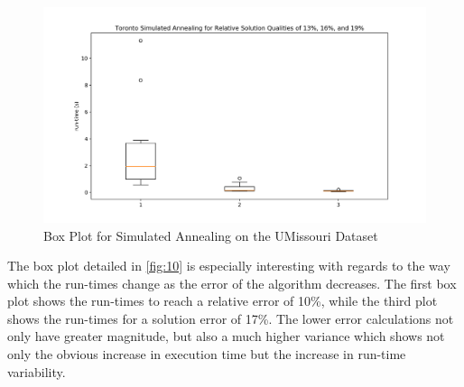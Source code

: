 \documentclass[format=sigconf]{acmart}
\begin{document}
\begin{figure}[htbp]
    \centerline{\includegraphics[scale=.5]{graphs/UMissouri_LS2_Box.png}}
    \caption{Box Plot for Simulated Annealing on the UMissouri Dataset}
    \label{fig12}
\end{figure}
The box plot detailed in \autoref{fig:10} is especially interesting with regards to the way which the run-times
change as the error of the algorithm decreases. The first box plot shows the run-times to reach a relative error of 10\%, while the third plot 
shows the run-times for a solution error of 17\%. The lower error calculations not only have greater magnitude, but also a much higher variance 
which shows not only the obvious increase in execution time but the increase in run-time variability.

 \clearpage
\end{document}

